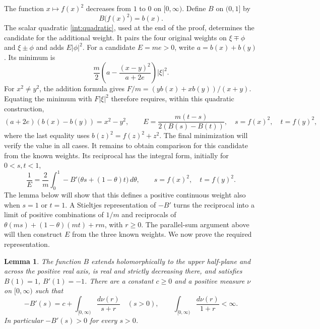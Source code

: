 \documentclass[11pt]{article}
\newtheorem{lemma}[theorem]{Lemma}
\theoremstyle{remark}\newtheorem{remark}[theorem]{Remark}
\begin{document}
The function $x\mapsto f(x)^2$ decreases from $1$ to $0$ on $[0,\infty)$.
Define $B$ on $(0,1]$ by
\begin{equation}\label{int:B-definition}
 B\bigl(f(x)^2\bigr)=b(x).
\end{equation}
The scalar quadratic \eqref{int:quadratic}, used at the end of the proof,
determines the candidate for the additional weight. It pairs the
four original weights on $\xi\mp\phi$ and $\xi\pm\phi$ and adds
$E|\phi|^2$. For a candidate $E=me>0$, write $a=b(x)+b(y)$. Its minimum is
\[
 \frac m2\left(a-\frac{(x-y)^2}{a+2e}\right)|\xi|^2.
\]
For $x^2\ne y^2$, the addition formula gives
$F/m=(yb(x)+xb(y))/(x+y)$. Equating the minimum with $F|\xi|^2$ therefore
requires, within this quadratic construction,
\[
 (a+2e)(b(x)-b(y))=x^2-y^2,
 \qquad
 E=\frac{m(t-s)}{2(B(s)-B(t))},
 \quad s=f(x)^2,\quad t=f(y)^2,
\]
where the last equality uses $b(z)^2=f(z)^2+z^2$. The final minimization
will verify the value in all cases. It remains to obtain comparison for
this candidate from the known weights. Its reciprocal has the integral
form, initially for $0<s,t<1$,
\begin{equation}\label{int:E-integral}
 \frac1E=\frac2m\int_0^1
       -B'\bigl(\theta s+(1-\theta)t\bigr)\,d\theta,
 \qquad s=f(x)^2,\quad t=f(y)^2.
\end{equation}
The lemma below will show that this defines a positive continuous weight
also when $s=1$ or $t=1$. A Stieltjes representation of $-B'$ turns
the reciprocal into a limit of positive combinations of $1/m$ and
reciprocals of
$\theta(ms)+(1-\theta)(mt)+rm$, with $r\ge0$.
The parallel-sum argument above will then construct $E$ from the three
known weights. We now prove the required representation.

\begin{lemma}\label{int:stieltjes}
The function $B$ extends holomorphically to the upper half-plane and
across the positive real axis, is real and strictly decreasing there,
and satisfies $B(1)=1$, $B'(1)=-1$.  There are a constant $c\ge0$ and a
positive measure $\nu$ on $[0,\infty)$ such that
\begin{equation}\label{int:stieltjes-form}
 -B'(s)=c+\int_{[0,\infty)}\frac{d\nu(r)}{s+r}
 \quad(s>0),\qquad
 \int_{[0,\infty)}\frac{d\nu(r)}{1+r}<\infty.
\end{equation}
In particular $-B'(s)>0$ for every $s>0$.
\end{lemma}
\end{document}
